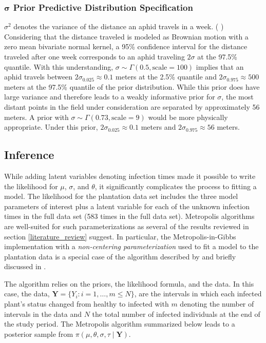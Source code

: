 \documentclass{uwstat572}
\newcommand{\vmadd}[1]{\textbf{\color{red}{#1}}}
\newcommand{\vmcomment}[1]{({\color{blue}{VM's comment:}} \textbf{\color{blue}{#1}})}
\begin{document}
\subsubsection{$\boldsymbol{\sigma}$ Prior Predictive Distribution Specification}
\vmadd{Parameter} $\sigma^2$ denotes the variance of the distance an aphid travels in a week.
\vmcomment{I advice against starting a sentence with a math symbol/notation.}  
Considering that the distance traveled is modeled as Brownian motion with a zero mean bivariate normal kernel, a 95\% confidence interval for the distance traveled after one week corresponds to an aphid traveling $2\sigma$ at the 97.5\% quantile. 
With this understanding, $\sigma \sim \Gamma(0.5, \text{scale}=100)$ implies that an aphid travels between $2\sigma_{0.025} \approx 0.1$ meters at the 2.5\% quantile and $2\sigma_{0.975} \approx 500$ meters at the 97.5\% quantile of the prior distribution. 
While this prior does have large variance and therefore leads to a weakly informative prior for $\sigma$, the most distant points in the field under consideration are separated by approximately 56 meters. 
A prior with $\sigma \sim \Gamma(0.73, \text{scale}=9)$ would be more physically appropriate. 
Under this prior, $2\sigma_{0.025} \approx 0.1$ meters and $2\sigma_{0.975} \approx 56$ meters. 

\subsection{Inference}
\label{inference}
While adding latent variables denoting infection times made it possible to write the likelihood for $\mu$, $\sigma$, and $\theta$, it significantly complicates the process to fitting a model. 
The likelihood for the plantation data set includes the three model parameters of interest plus a latent variable for each of the unknown infection times in the full data set (583 times in the full data set). 
Metropolis algorithms are well-suited for such parameterizations as several of the results reviewed in section \ref{literature_review} suggest.  
In particular, the Metropolis-\vmadd{with}in-Gibbs implementation with a \textit{non-centering parameterization} used to fit a model to the plantation data is a special case of the algorithm described by \citet{Jewell} and briefly discussed in \citep{ONeill}.  

The algorithm relies on the priors, the likelihood formula, and the data. 
In this case, the data, $\textbf{Y} = \{Y_i:i=1,\dots, m \le N\}$, are the intervals in which each infected plant's status changed from healthy to infected with $m$ denoting the number of intervals in the data and $N$ the total number of infected individuals at the end of the study period. 
The Metropolis algorithm summarized below leads to a posterior sample from $\pi(\mu, \theta, \sigma, \tau \mid \textbf{Y})$. 
\end{document}
